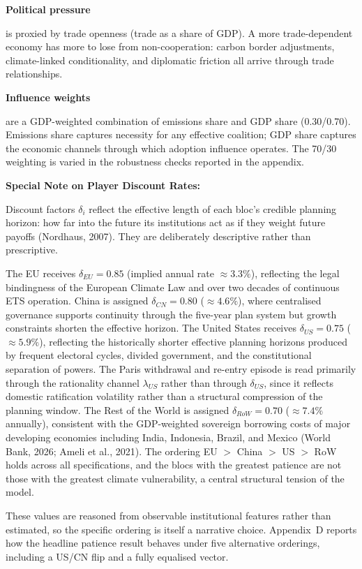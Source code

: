 \documentclass[10pt,a4paper]{article}
\newcommand{\bpar}[1]{%
  \par\addvspace{\medskipamount}%
  \needspace{4\baselineskip}%
  \noindent\textbf{#1}\par\nopagebreak[4]%
}
\begin{document}
\bpar{Political pressure} is proxied by trade openness (trade as a share of GDP). A more trade-dependent economy has more to lose from non-cooperation: carbon border adjustments, climate-linked conditionality, and diplomatic friction all arrive through trade relationships.

\bpar{Influence weights} are a GDP-weighted combination of emissions share and GDP share (0.30/0.70). Emissions share captures necessity for any effective coalition; GDP share captures the economic channels through which adoption influence operates. The 70/30 weighting is varied in the robustness checks reported in the appendix.

\bpar{Special Note on Player Discount Rates:}
Discount factors $\delta_i$ reflect the effective length of each bloc's credible planning horizon: how
far into the future its institutions act as if they weight future payoffs (Nordhaus, 2007). They are
deliberately descriptive rather than prescriptive.

The EU receives $\delta_{EU} = 0.85$ (implied annual rate $\approx 3.3\%$), reflecting the legal
bindingness of the European Climate Law and over two decades of continuous ETS operation. China is
assigned $\delta_{CN} = 0.80$ ($\approx 4.6\%$), where centralised governance supports continuity
through the five-year plan system but growth constraints shorten the effective horizon. The United
States receives $\delta_{US} = 0.75$ ($\approx 5.9\%$), reflecting the historically shorter effective
planning horizons produced by frequent electoral cycles, divided government, and the constitutional
separation of powers. The Paris withdrawal and re-entry episode is read primarily through the
rationality channel $\lambda_{US}$ rather than through $\delta_{US}$, since it reflects domestic
ratification volatility rather than a structural compression of the planning window. The Rest of the
World is assigned $\delta_{RoW} = 0.70$ ($\approx 7.4\%$ annually), consistent with the GDP-weighted
sovereign borrowing costs of major developing economies including India, Indonesia, Brazil, and Mexico
(World Bank, 2026; Ameli et al., 2021). The ordering EU $>$ China $>$ US $>$ RoW holds across all
specifications, and the blocs with the greatest patience are not those with the greatest climate
vulnerability, a central structural tension of the model.

These values are reasoned from observable institutional features rather than estimated, so the
specific ordering is itself a narrative choice. Appendix~D reports how the headline patience result
behaves under five alternative orderings, including a US/CN flip and a fully equalised vector.
\end{document}
